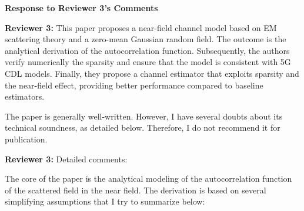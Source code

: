 \documentclass[a4paper,12pt]{article}
\begin{document}
{}

\clearpage 



\begin{center}
    {\Large\bf Response to Reviewer 3's Comments}
\end{center}

\textbf{Reviewer 3:}
This paper proposes a near-field channel model based on EM scattering theory and a zero-mean Gaussian random field. The outcome is the analytical derivation of the autocorrelation function. Subsequently, the authors verify numerically the sparsity and ensure that the model is consistent with 5G CDL models. Finally, they propose a channel estimator that exploits sparsity and the near-field effect, providing better performance compared to baseline estimators.

The paper is generally well-written. However, I have several doubts about its technical soundness, as detailed below. Therefore, I do not recommend it for publication.

{}

\textbf{Reviewer 3:}
Detailed comments:

The core of the paper is the analytical modeling of the autocorrelation function of the scattered field in the near field. The derivation is based on several simplifying assumptions that I try to summarize below:

{}
\end{document}
